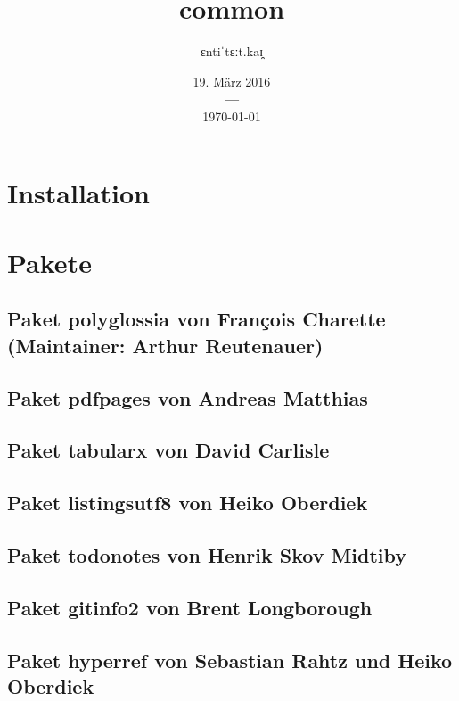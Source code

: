 \documentclass[a4paper,12pt]{article}
\title{\fontspec{Times New Roman}common}
\author{\fontspec{Times New Roman}ɛntiˈtɛːt.kaɪ̯}
\date{%
			{\fontspec{Times New Roman}19. März 2016} \\
			{\bf---} \\[0.2\baselineskip]
			\fontspec{Times New Roman}\today}
\begin{document}
		\listoftodos

		

		\maketitle


		\tableofcontents  %

		\chapter{Installation}
		\chapter{Pakete}
			\section{Paket polyglossia von François Charette (Maintainer: Arthur
				Reutenauer)}
				
			\section{Paket pdfpages von Andreas Matthias}
				
			\section{Paket tabularx von David Carlisle}
				
			\section{Paket listingsutf8 von Heiko Oberdiek}
				
			\section{Paket todonotes von Henrik Skov Midtiby}
				
			\section{Paket gitinfo2 von Brent Longborough}
				
			\section{Paket hyperref von Sebastian Rahtz und Heiko Oberdiek}
				
\end{document}
